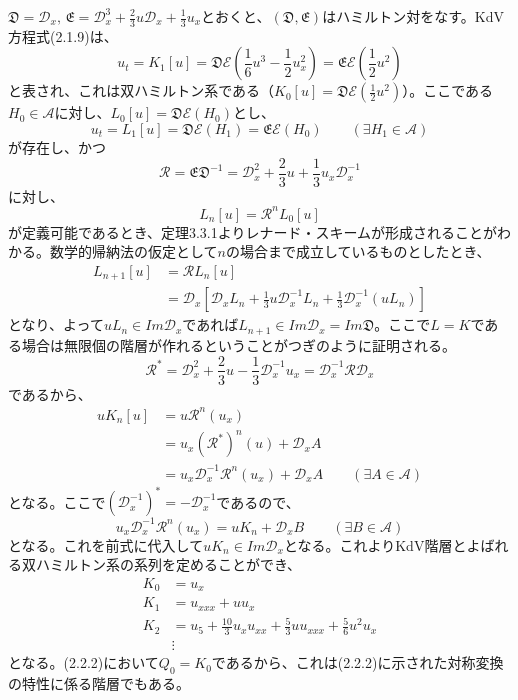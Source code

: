 \documentclass[a4paper, 11pt]{report}
\theoremstyle{definition}
\begin{document}
 $\mathfrak{D}=\mathcal{D}_x, \, \mathfrak{E}=\mathcal{D}_x^3+\frac{2}{3}u\mathcal{D}_x+\frac{1}{3}u_x$とおくと、$(\mathfrak{D},\mathfrak{E})$はハミルトン対をなす。KdV方程式(2.1.9)は、
\begin{equation}
u_t = K_1[u] = \mathfrak{D}\mathcal{E}(\frac{1}{6}u^3-\frac{1}{2}u_x^2) = \mathfrak{E}\mathcal{E}(\frac{1}{2}u^2)  %
\end{equation}
と表され、これは双ハミルトン系である（$K_0[u]=\mathfrak{D}\mathcal{E}(\frac{1}{2}u^2)$）。ここである$H_0\in\mathcal{A}$に対し、$L_0[u]=\mathfrak{D}\mathcal{E}(H_0)$とし、
\begin{equation*}
u_t = L_1[u] = \mathfrak{D}\mathcal{E}(H_1) = \mathfrak{E}\mathcal{E}(H_0) \qquad (\exists H_1\in\mathcal{A})
\end{equation*}
が存在し、かつ
\begin{equation*}
\mathcal{R}=\mathfrak{E}\mathfrak{D}^{-1}=\mathcal{D}_x^2+\frac{2}{3}u+\frac{1}{3}u_x\mathcal{D}_x^{-1}
\end{equation*}
に対し、
\begin{equation*}
L_n[u] = \mathcal{R}^nL_0[u]
\end{equation*}
が定義可能であるとき、定理3.3.1よりレナード・スキームが形成されることがわかる。数学的帰納法の仮定として$n$の場合まで成立しているものとしたとき、
\begin{align*}
L_{n+1}[u] &= \mathcal{R}L_n[u]\\
&= \mathcal{D}_x[\mathcal{D}_xL_n+\frac{1}{3}u\mathcal{D}_x^{-1}L_n+\frac{1}{3}\mathcal{D}_x^{-1}(uL_n)]
\end{align*}
となり、よって$uL_n\in Im\mathcal{D}_x$であれば$L_{n+1}\in Im\mathcal{D}_x=Im\mathfrak{D}$。ここで$L=K$である場合は無限個の階層が作れるということがつぎのように証明される。
\begin{equation*}
\mathcal{R}^* = \mathcal{D}_x^2+\frac{2}{3}u-\frac{1}{3}\mathcal{D}_x^{-1}u_x = \mathcal{D}_x^{-1}\mathcal{R}\mathcal{D}_x
\end{equation*}
であるから、
\begin{align*}
uK_n[u] &= u\mathcal{R}^n(u_x)\\
&= u_x(\mathcal{R}^*)^n(u)+\mathcal{D}_xA\\
&= u_x\mathcal{D}_x^{-1}\mathcal{R}^n(u_x)+\mathcal{D}_xA \qquad (\exists A\in\mathcal{A})
\end{align*}
となる。ここで$(\mathcal{D}_x^{-1})^*=-\mathcal{D}_x^{-1}$であるので、
\begin{equation*}
u_x\mathcal{D}_x^{-1}\mathcal{R}^n(u_x) = uK_n+\mathcal{D}_xB \qquad (\exists B\in\mathcal{A})
\end{equation*}
となる。これを前式に代入して$uK_n\in Im\mathcal{D}_x$となる。これよりKdV階層とよばれる双ハミルトン系の系列を定めることができ、
\begin{align*}
K_0 &= u_x\\
K_1 &= u_{xxx}+uu_x\\
K_2 &= u_5+\frac{10}{3}u_xu_{xx}+\frac{5}{3}uu_{xxx}+\frac{5}{6}u^2u_x\\
&\vdots
\end{align*}
となる。(2.2.2)において$Q_0=K_0$であるから、これは(2.2.2)に示された対称変換の特性に係る階層でもある。
\end{document}
